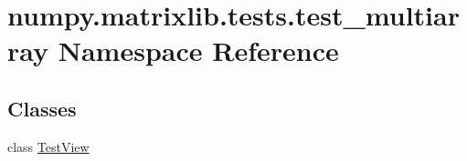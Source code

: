 \hypertarget{namespacenumpy_1_1matrixlib_1_1tests_1_1test__multiarray}{}\section{numpy.\+matrixlib.\+tests.\+test\+\_\+multiarray Namespace Reference}
\label{namespacenumpy_1_1matrixlib_1_1tests_1_1test__multiarray}
\subsection*{Classes}
\begin{DoxyCompactItemize}
\item 
class \hyperlink{classnumpy_1_1matrixlib_1_1tests_1_1test__multiarray_1_1TestView}{Test\+View}
\end{DoxyCompactItemize}
